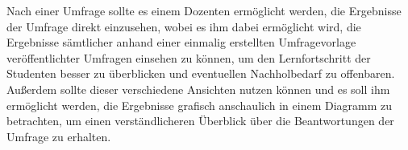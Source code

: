 Nach einer Umfrage sollte es einem Dozenten ermöglicht werden, die Ergebnisse der Umfrage direkt einzusehen, wobei es ihm dabei ermöglicht wird, die Ergebnisse sämtlicher anhand einer einmalig erstellten Umfragevorlage veröffentlichter Umfragen einsehen zu können, um den Lernfortschritt der Studenten besser zu überblicken und eventuellen Nachholbedarf zu offenbaren.
Außerdem sollte dieser verschiedene Ansichten nutzen können und es soll ihm ermöglicht werden, die Ergebnisse grafisch anschaulich in einem Diagramm zu betrachten, um einen verständlicheren Überblick über die Beantwortungen der Umfrage zu erhalten.



